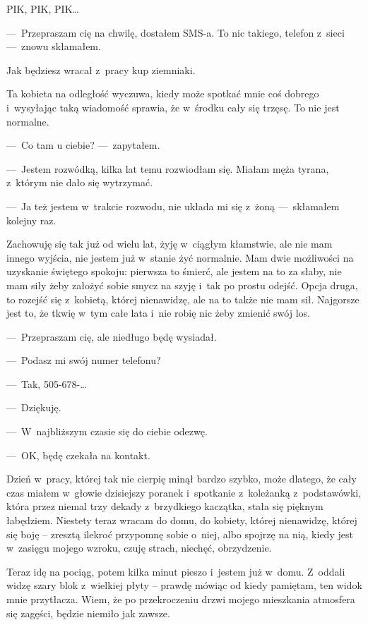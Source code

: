 PIK, PIK, PIK…
 
---~Przepraszam cię na chwilę, dostałem SMS-a. To nic takiego, telefon z~sieci ---~znowu skłamałem.

\begin{itquote}
Jak będziesz wracał z~pracy kup ziemniaki.
\end{itquote}

Ta kobieta na odległość wyczuwa, kiedy może spotkać mnie coś dobrego i~wysyłając taką wiadomość sprawia, że w~środku 
cały się trzęsę. To nie jest normalne.

---~Co tam u ciebie? ---~zapytałem.

---~Jestem rozwódką, kilka lat temu rozwiodłam się. Miałam męża tyrana, z~którym nie dało się wytrzymać.

---~Ja też jestem w~trakcie rozwodu, nie układa mi się z~żoną ---~skłamałem kolejny raz.

Zachowuję się tak już od wielu lat, żyję w~ciągłym kłamstwie, ale nie mam innego wyjścia, nie jestem już w~stanie żyć 
normalnie. Mam dwie możliwości na uzyskanie świętego spokoju: pierwsza to śmierć, ale jestem na to za słaby, nie mam 
siły żeby założyć sobie smycz na szyję i~tak po prostu odejść. Opcja druga, to rozejść się z~kobietą, której 
nienawidzę, ale na to także nie mam sił. Najgorsze jest to, że tkwię w~tym całe lata i~nie robię nic żeby zmienić 
swój los.

---~Przepraszam cię, ale niedługo będę wysiadał.

---~Podasz mi swój numer telefonu?

---~Tak, 505-678-…

---~Dziękuję.

---~W~najbliższym czasie się do ciebie odezwę.

---~OK, będę czekała na kontakt.

Dzień w~pracy, której tak nie cierpię minął bardzo szybko, może dlatego, że cały czas miałem w~głowie dzisiejszy 
poranek i~spotkanie z~koleżanką z~podstawówki, która przez niemal trzy dekady z~brzydkiego kaczątka, stała się 
pięknym łabędziem. Niestety teraz wracam do domu, do kobiety, której nienawidzę, której się boję -- zresztą ilekroć 
przypomnę sobie o~niej, albo spojrzę na nią, kiedy jest w~zasięgu mojego wzroku, czuję strach, niechęć, obrzydzenie.

Teraz idę na pociąg, potem kilka minut pieszo i~jestem już w~domu. Z~oddali widzę szary blok z~wielkiej płyty -- 
prawdę mówiąc od kiedy pamiętam, ten widok mnie przytłacza. Wiem, że po przekroczeniu drzwi mojego mieszkania 
atmosfera się zagęści, będzie niemiło jak zawsze.

